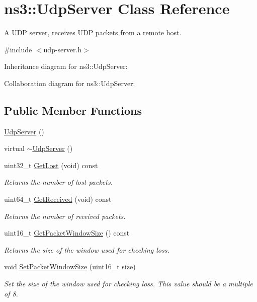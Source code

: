 \hypertarget{classns3_1_1UdpServer}{}\section{ns3\+:\+:Udp\+Server Class Reference}
\label{classns3_1_1UdpServer}


A U\+DP server, receives U\+DP packets from a remote host.  




{\ttfamily \#include $<$udp-\/server.\+h$>$}



Inheritance diagram for ns3\+:\+:Udp\+Server\+:


Collaboration diagram for ns3\+:\+:Udp\+Server\+:
\subsection*{Public Member Functions}
\begin{DoxyCompactItemize}
\item 
\hyperlink{classns3_1_1UdpServer_aa76d63101cbf7ed83745c55dadc033ce}{Udp\+Server} ()
\item 
virtual \hyperlink{classns3_1_1UdpServer_a26b1cd0ad57e598e815fac2abbd1ef97}{$\sim$\+Udp\+Server} ()
\item 
uint32\+\_\+t \hyperlink{classns3_1_1UdpServer_ae4702ca7e022bf5e960fce26c1198b8e}{Get\+Lost} (void) const 
\begin{DoxyCompactList}\small\item\em Returns the number of lost packets. \end{DoxyCompactList}\item 
uint64\+\_\+t \hyperlink{classns3_1_1UdpServer_a679b871e557f7743e390d5adea8f2d48}{Get\+Received} (void) const 
\begin{DoxyCompactList}\small\item\em Returns the number of received packets. \end{DoxyCompactList}\item 
uint16\+\_\+t \hyperlink{classns3_1_1UdpServer_a385b6184e0b3fde69ecf1c72b38b3ad8}{Get\+Packet\+Window\+Size} () const 
\begin{DoxyCompactList}\small\item\em Returns the size of the window used for checking loss. \end{DoxyCompactList}\item 
void \hyperlink{classns3_1_1UdpServer_a9ec06834b376c13c9f5888ccd7ed2d51}{Set\+Packet\+Window\+Size} (uint16\+\_\+t size)
\begin{DoxyCompactList}\small\item\em Set the size of the window used for checking loss. This value should be a multiple of 8. \end{DoxyCompactList}\end{DoxyCompactItemize}
